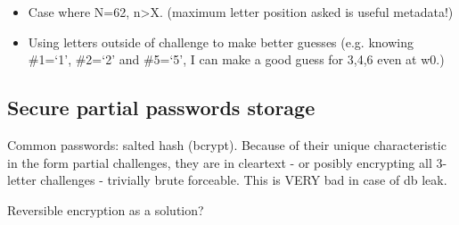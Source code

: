       \begin{itemize}
        \item Case where N=62, n>X. (maximum letter position asked is useful metadata!)
        \item Using letters outside of challenge to make better guesses (e.g. knowing \#1=`1', \#2=`2' and \#5=`5', I can make a good guess for 3,4,6 even at w0.)
      \end{itemize}

    \subsection{Secure partial passwords storage}
      \label{ssec:secure_store}
      Common passwords: salted hash (bcrypt). Because of their unique characteristic in the form partial challenges, they are in cleartext - or posibly encrypting all 3-letter challenges - trivially brute forceable. This is VERY bad in case of db leak.

      Reversible encryption as a solution?